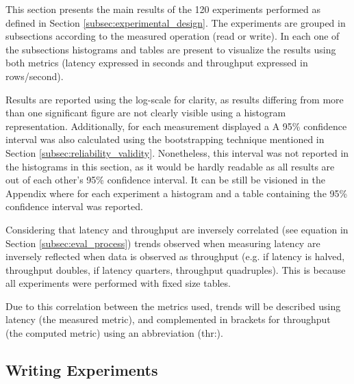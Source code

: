This section presents the main results of the 120 experiments performed as defined in Section \ref{subsec:experimental_design}. The experiments are grouped in subsections according to the measured operation (read or write). In each one of the subsections histograms and tables are present to visualize the results using both metrics (latency expressed in seconds and throughput expressed in rows/second).

Results are reported using the log-scale for clarity, as results differing from more than one significant figure are not clearly visible using a histogram representation. Additionally, for each measurement displayed a A 95\% confidence interval was also calculated using the bootstrapping technique mentioned in Section \ref{subsec:reliability_validity}. Nonetheless, this interval was not reported in the histograms in this section, as it would be hardly readable as all results are out of each other's 95\% confidence interval. It can be still be visioned in the Appendix  where for each experiment a histogram and a table containing the 95\% confidence interval was reported.

Considering that latency and throughput are inversely correlated (see equation in Section \ref{subsec:eval_process}) trends observed when measuring latency are inversely reflected when data is observed as throughput (e.g. if latency is halved, throughput doubles, if latency quarters, throughput quadruples). This is because all experiments were performed with fixed size tables.

Due to this correlation between the metrics used, trends will be described using latency (the measured metric), and complemented in brackets for throughput (the computed metric) using an abbreviation (thr:).

\subsection{Writing Experiments}

